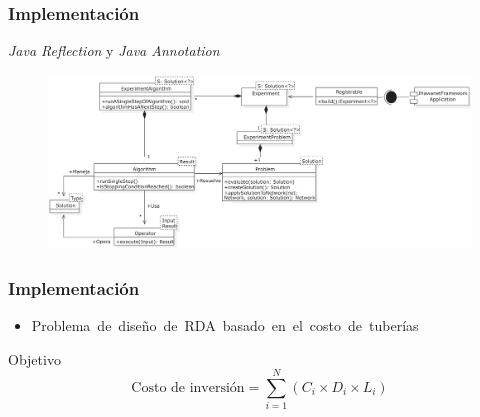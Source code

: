 \documentclass[9pt]{beamer}
\begin{document}
    \begin{frame}
        \frametitle{Implementación}                       
        \textit{Java Reflection} y \textit{Java Annotation}
        \begin{figure}
            \includegraphics[width=\textwidth]{assets/InterfazHumano-app.eps}
        \end{figure}

    \end{frame}

    \begin{frame}
        \frametitle{Implementación}                       
        \begin{itemize}
            \item Problema de diseño de RDA basado en el costo de tuberías
        \end{itemize} 

        \begin{block}{Objetivo}
            \begin{equation*}
                \text{Costo de inversión} = \sum_{i=1}^{N} (C_i \times D_i \times L_i)
            \end{equation*}
        \end{block}
        
    \end{frame}
\end{document}
